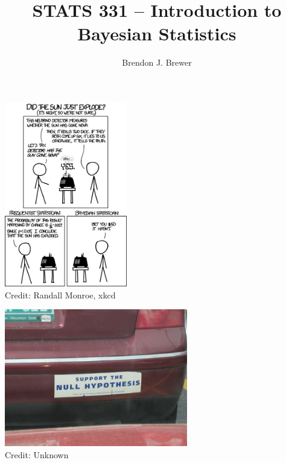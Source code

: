 \documentclass{beamer}
\author{Brendon J. Brewer}
\title{STATS 331 -- Introduction to Bayesian Statistics}
\institute{The University of Auckland}
\date{}
\begin{document}
\frame{\titlepage}

\begin{frame}
\begin{center}
\includegraphics[width=0.4\textwidth]{images/xkcd.png} \\
Credit: Randall Monroe, xkcd
\end{center}

\end{frame}

\begin{frame}
\begin{center}
\includegraphics[width=0.6\textwidth]{images/support_null.png} \\
Credit: Unknown
\end{center}

\end{frame}
\end{document}
